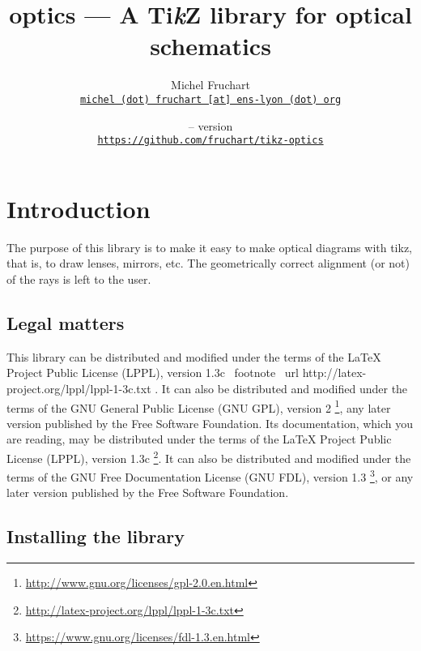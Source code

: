 \documentclass[a4paper]{ltxdoc}
\begin{document}
\VerbatimFootnotes

\title{optics --- A Ti\emph{k}Z library for optical schematics}
\author{Michel Fruchart \\
\href{mailto:michel (dot) fruchart [at] ens-lyon (dot) org}{\texttt{michel (dot) fruchart [at] ens-lyon (dot) org}}}

\date{\tikzopticsversiondate{} -- version \tikzopticsversion \\[0.15cm]
\large\href{https://github.com/fruchart/tikz-optics}{\texttt{https://github.com/fruchart/tikz-optics}}}

\maketitle

\section{Introduction}

The purpose of this library is to make it easy to make optical diagrams with tikz, that is, to draw lenses, mirrors, etc. The geometrically correct alignment (or not) of the rays is left to the user.

\subsection{Legal matters}

This library can be distributed and modified under the terms of the LaTeX Project Public License (LPPL), version 1.3c \ footnote {\ url {http://latex-project.org/lppl/lppl-1-3c.txt} }. It can also be distributed and modified under the terms of the GNU General Public License (GNU GPL), version 2 \footnote {\url{http://www.gnu.org/licenses/gpl-2.0.en.html}}, any later version published by the Free Software Foundation. Its documentation, which you are reading, may be distributed under the terms of the LaTeX Project Public License (LPPL), version 1.3c \footnote {\url{http://latex-project.org/lppl/lppl-1-3c.txt}}. It can also be distributed and modified under the terms of the GNU Free Documentation License (GNU FDL), version 1.3 \footnote{\url{https://www.gnu.org/licenses/fdl-1.3.en.html}}, or any later version published by the Free Software Foundation.

\subsection{Installing the library}
\end{document}
